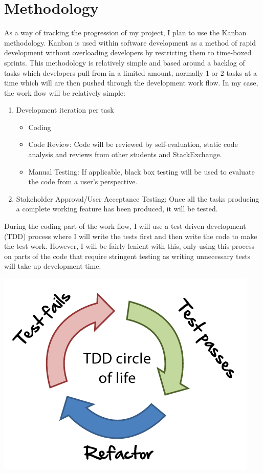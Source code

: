 \documentclass[]{report}
\begin{document}
	\section{Methodology}
		As a way of tracking the progression of my project, I plan to use the Kanban methodology. Kanban is used within software development as a method of rapid development without overloading developers by restricting them to time-boxed sprints. This methodology is relatively simple and based around a backlog of tasks which developers pull from in a limited amount, normally 1 or 2 tasks at a time which will are then pushed through the development work flow. In my case, the work flow will be relatively simple:
			\begin{enumerate}
				\item Development iteration per task
				\begin{itemize}
					\item Coding
					\item Code Review: Code will be reviewed by self-evaluation, static code analysis and reviews from other students and StackExchange.
					\item Manual Testing: If applicable, black box testing will be used to evaluate the code from a user's perspective.
				\end{itemize}
				\item Stakeholder Approval/User Acceptance Testing: Once all the tasks producing a complete working feature has been produced, it will be tested. 
			\end{enumerate}
		During the coding part of the work flow, I will use a test driven development (TDD) process where I will write the tests first and then write the code to make the test work. However, I will be fairly lenient with this, only using this process on parts of the code that require stringent testing as writing unnecessary tests will take up development time. 
		\begin{center}
			\includegraphics[scale=0.5]{tdd-circle-of-life.png}
		\end{center}
	
\end{document}
